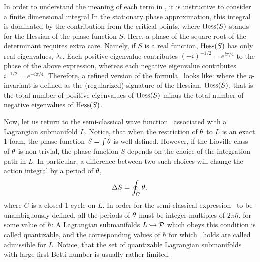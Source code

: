 In order to understand the meaning of each term in \semiclassb,
it is instructive to consider a finite dimensional integral
%
\eqn{}
%
In the stationary phase approximation, this integral is
dominated by the contribution from the critical points,
%
\eqn{}
%
where ${\rm Hess} (S)$ stands for the Hessian of the phase function $S$.
Here, a phase of the square root of the determinant requires extra care.
Namely, if $S$ is a real function,
${\rm Hess} (S)$ has only real eigenvalues, $\lambda_i$.
Each positive eigenvalue contributes $(-i)^{-1/2} = e^{i \pi /4}$
to the phase of the above expression, whereas each negative eigenvalue
contributes $i^{-1/2} = e^{- i \pi /4}$.
Therefore, a refined version of the formula \semiclassa\ looks like:
%
\eqn{}
%
where the $\eta$-invariant
%
\eqn{}
%
is defined as the (regularized) signature of the Hessian, ${\rm Hess}(S)$,
that is the total number of positive eigenvalues of ${\rm Hess}(S)$
minus the total number of negative eigenvalues of ${\rm Hess}(S)$.

Now, let us return to the semi-classical wave function \semiclassb\
associated with a Lagrangian submanifold $L$.
Notice, that when the restriction of $\theta$ to
$L$ is an exact 1-form,
the phase function $S = \int \theta$ is well defined.
However, if the Lioville class of $\theta$ is non-trivial, the phase
function $S$ depends on the choice of the integration path in $L$.
In particular, a difference between two such choices
will change the action integral by a period of $\theta$,
$$
\Delta S = \oint_C \theta,
$$
where $C$ is a closed 1-cycle on $L$.
In order for the semi-classical expression \semiclassb\ to be
unambiguously defined, all the periods of $\theta$ must be
integer multiples of $2 \pi \hbar$, for some value of $\hbar$:
%
\eqn{}
%
A Lagrangian submanifolds $L \hookrightarrow {\cal P}$
which obeys this condition is called quantizable,
and the corresponding values of $\hbar$ for which
\quantcond\ holds are called admissible for $L$.
Notice, that the set of quantizable Lagrangian submanifolds
with large first Betti number is usually rather limited.

\ifig{}
{}

